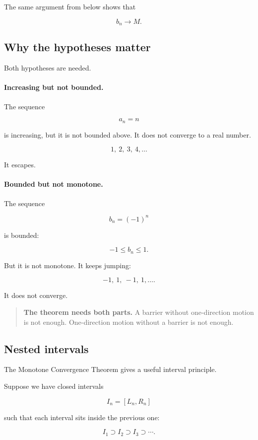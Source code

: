 The same argument from below shows that

\[
b_n\to M.
\]

\subsection{Why the hypotheses matter}
\label{appsubsec:monotone-theorem-hypotheses}

Both hypotheses are needed.

\paragraph{Increasing but not bounded.}
The sequence

\[
a_n=n
\]

is increasing, but it is not bounded above.  It does not converge to a real number.

\[
1,\ 2,\ 3,\ 4,\ldots
\]

It escapes.

\paragraph{Bounded but not monotone.}
The sequence

\[
b_n=(-1)^n
\]

is bounded:

\[
-1\le b_n\le 1.
\]

But it is not monotone.  It keeps jumping:

\[
-1,\ 1,\ -1,\ 1,\ldots.
\]

It does not converge.

\begin{quote}
\textbf{The theorem needs both parts.}
A barrier without one-direction motion is not enough.  One-direction motion without a
barrier is not enough.
\end{quote}

\subsection{Nested intervals}
\label{appsubsec:nested-intervals}

The Monotone Convergence Theorem gives a useful interval principle.

Suppose we have closed intervals

\[
I_n=[L_n,R_n]
\]

such that each interval sits inside the previous one:

\[
I_1\supset I_2\supset I_3\supset\cdots.
\]

